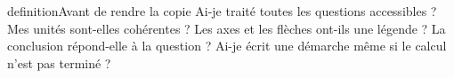 \begin{pcEncadre}{definition}{Avant de rendre la copie}
Ai-je traité toutes les questions accessibles ? Mes unités sont-elles cohérentes ? Les axes et les flèches ont-ils une légende ? La conclusion répond-elle à la question ? Ai-je écrit une démarche même si le calcul n’est pas terminé ?
\end{pcEncadre}
